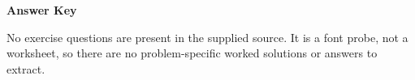 \documentclass[11pt]{article}
\begin{document}
\begin{center}\large\bfseries Answer Key\end{center}\par\medskip
No exercise questions are present in the supplied source. It is a font probe, not a worksheet, so there are no problem-specific worked solutions or answers to extract.
\end{document}
